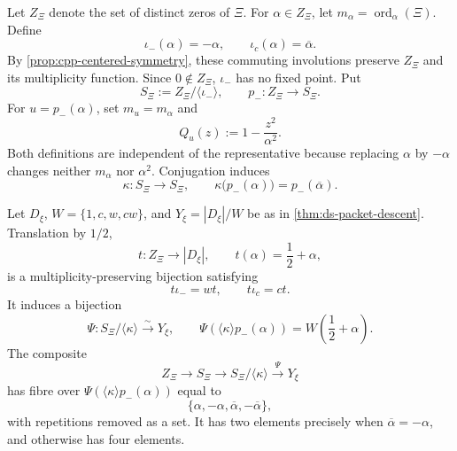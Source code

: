 Let \(Z_\Xi\) denote the set of distinct zeros of \(\Xi\).  For
\(\alpha\in Z_\Xi\), let
\(m_\alpha=\operatorname{ord}_\alpha(\Xi)\).  Define
\[
 \iota_-(\alpha)=-\alpha,
 \qquad
 \iota_c(\alpha)=\overline\alpha.
\]
By \cref{prop:cpp-centered-symmetry}, these commuting involutions preserve
\(Z_\Xi\) and its multiplicity function.  Since \(0\notin Z_\Xi\),
\(\iota_-\) has no fixed point.  Put
\begin{equation}
\label{eq:cpp-sign-orbit-space}
 S_\Xi:=Z_\Xi/\langle\iota_-\rangle,
 \qquad
 p_-:Z_\Xi\longrightarrow S_\Xi.
\end{equation}
For \(u=p_-(\alpha)\), set \(m_u=m_\alpha\) and
\begin{equation}
\label{eq:cpp-sign-factor}
 Q_u(z):=1-\frac{z^2}{\alpha^2}.
\end{equation}
Both definitions are independent of the representative because replacing
\(\alpha\) by \(-\alpha\) changes neither \(m_\alpha\) nor \(\alpha^2\).
Conjugation induces
\begin{equation}
\label{eq:cpp-conjugation-on-sign-orbits}
 \kappa:S_\Xi\longrightarrow S_\Xi,
 \qquad
 \kappa\bigl(p_-(\alpha)\bigr)=p_-(\overline\alpha).
\end{equation}

\begin{theorem}
\label{thm:cpp-sign-packet-quotient}
Let \(D_\xi\), \(W=\{1,c,w,cw\}\), and
\(Y_\xi=|D_\xi|/W\) be as in \cref{thm:ds-packet-descent}.  Translation by
\(1/2\),
\[
 t:Z_\Xi\longrightarrow |D_\xi|,
 \qquad
 t(\alpha)=\frac12+\alpha,
\]
is a multiplicity-preserving bijection satisfying
\begin{equation}
\label{eq:cpp-translation-equivariance}
 t\iota_-=wt,
 \qquad
 t\iota_c=ct.
\end{equation}
It induces a bijection
\begin{equation}
\label{eq:cpp-sign-packet-bijection}
 \Psi:S_\Xi/\langle\kappa\rangle
 \overset{\sim}{\longrightarrow}Y_\xi,
 \qquad
 \Psi\!\left(\langle\kappa\rangle p_-(\alpha)\right)
 =
 W\!\left(\frac12+\alpha\right).
\end{equation}
The composite
\[
 Z_\Xi\longrightarrow S_\Xi
 \longrightarrow S_\Xi/\langle\kappa\rangle
 \overset{\Psi}{\longrightarrow}Y_\xi
\]
has fibre over \(\Psi(\langle\kappa\rangle p_-(\alpha))\) equal to
\begin{equation}
\label{eq:cpp-zero-to-packet-fibre}
 \{\alpha,-\alpha,\overline\alpha,-\overline\alpha\},
\end{equation}
with repetitions removed as a set.  It has two elements precisely when
\(\overline\alpha=-\alpha\), and otherwise has four elements.
\end{theorem}

